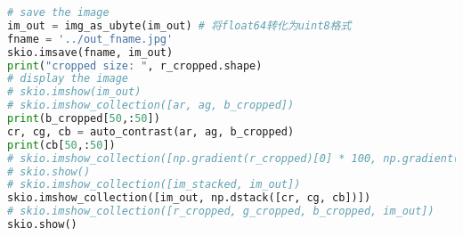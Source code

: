 \documentclass[withoutpreface,bwprint]{cumcmthesis} %
\begin{document}
\begin{appendices}
\begin{lstlisting}[language=python]
# save the image
im_out = img_as_ubyte(im_out) # 将float64转化为uint8格式
fname = '../out_fname.jpg'
skio.imsave(fname, im_out)
print("cropped size: ", r_cropped.shape)
# display the image
# skio.imshow(im_out)
# skio.imshow_collection([ar, ag, b_cropped])
print(b_cropped[50,:50])
cr, cg, cb = auto_contrast(ar, ag, b_cropped)
print(cb[50,:50])
# skio.imshow_collection([np.gradient(r_cropped)[0] * 100, np.gradient(b_cropped)[0] * 100])
# skio.show()
# skio.imshow_collection([im_stacked, im_out])
skio.imshow_collection([im_out, np.dstack([cr, cg, cb])])
# skio.imshow_collection([r_cropped, g_cropped, b_cropped, im_out])
skio.show()
\end{lstlisting}
\end{appendices}
\end{document}
